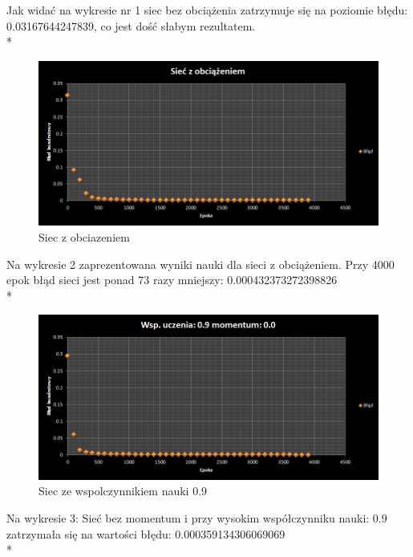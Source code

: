 \documentclass{classrep}
\begin{document}
Jak widać na wykresie nr 1 siec bez obciążenia zatrzymuje się na poziomie błędu: 0.03167644247839,
co jest dość słabym rezultatem.
\\*

\begin{figure}[ht]
\centering
			\includegraphics[scale=0.65]{pictures/test02.png}
	\caption{Siec z obciazeniem}
	\label{fig:Siec z obciazeniem}
\end{figure}

Na wykresie 2 zaprezentowana wyniki nauki dla sieci z obciążeniem. Przy 4000 epok błąd sieci jest ponad 73 razy mniejszy: 0.000432373272398826
\\*

\begin{figure}[ht]
\centering
			\includegraphics[scale=0.65]{pictures/test03.png}
	\caption{Siec ze wspolczynnikiem nauki 0.9}
	\label{fig:Siec ze wspolczynnikiem nauki 0.9}
\end{figure}

Na wykresie 3: Sieć bez momentum i przy wysokim współczynniku nauki: 0.9 zatrzymała się na wartości błędu: 0.000359134306069069
\\*
\end{document}

